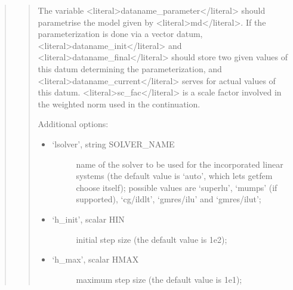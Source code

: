 \documentclass[a4paper,11pt,english]{sphinxmanual}
\begin{document}
\sphinxAtStartPar
{}
\begin{quote}

\sphinxAtStartPar
{}
\begin{quote}

\sphinxAtStartPar
The variable \textless{}literal\textgreater{}dataname\_parameter\textless{}/literal\textgreater{} should parametrise the model given by
\textless{}literal\textgreater{}md\textless{}/literal\textgreater{}. If the parameterization is done via a vector datum, \textless{}literal\textgreater{}dataname\_init\textless{}/literal\textgreater{}
and \textless{}literal\textgreater{}dataname\_final\textless{}/literal\textgreater{} should store two given values of this datum
determining the parameterization, and \textless{}literal\textgreater{}dataname\_current\textless{}/literal\textgreater{} serves for actual
values of this datum. \textless{}literal\textgreater{}sc\_fac\textless{}/literal\textgreater{} is a scale factor involved in the weighted
norm used in the continuation.

\sphinxAtStartPar
Additional options:
\begin{itemize}
\item {} \begin{description}
\item[{‘lsolver’, string SOLVER\_NAME}] \leavevmode
\sphinxAtStartPar
name of the solver to be used for the incorporated linear systems
(the default value is ‘auto’, which lets getfem choose itself);
possible values are ‘superlu’, ‘mumps’ (if supported), ‘cg/ildlt’,
‘gmres/ilu’ and ‘gmres/ilut’;

\end{description}

\item {} \begin{description}
\item[{‘h\_init’, scalar HIN}] \leavevmode
\sphinxAtStartPar
initial step size (the default value is 1e\sphinxhyphen{}2);

\end{description}

\item {} \begin{description}
\item[{‘h\_max’, scalar HMAX}] \leavevmode
\sphinxAtStartPar
maximum step size (the default value is 1e\sphinxhyphen{}1);


\end{description}
\end{itemize}
\end{quote}
\end{quote}
\end{document}
